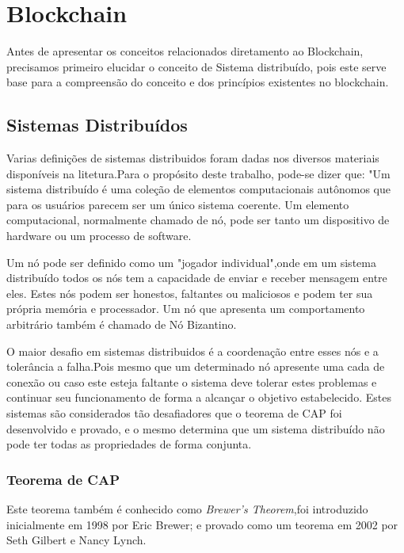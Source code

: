\section{Blockchain}

    Antes de apresentar os conceitos relacionados diretamento ao Blockchain, precisamos primeiro elucidar o conceito de Sistema distribuído, pois este serve
    base para a compreensão do conceito e dos princípios existentes no blockchain.

\subsection[]{Sistemas Distribuídos}

    Varias definições de sistemas distribuidos foram dadas nos diversos materiais disponíveis na litetura.Para o propósito deste trabalho, pode-se dizer que: "Um sistema distribuído é uma coleção de 
    elementos computacionais autônomos que para os usuários parecem ser um único sistema coerente. Um elemento computacional, normalmente chamado de nó, pode
    ser tanto um dispositivo de hardware ou um processo de software.\cite{sistemas_distribuidos_tanembaum}

    Um nó pode ser definido como um "jogador individual",onde em um sistema distribuído todos os nós tem a capacidade de enviar e receber mensagem entre eles. Estes
    nós podem ser honestos, faltantes ou maliciosos e podem ter sua própria memória e processador. Um nó que apresenta um comportamento arbitrário também é
    chamado de Nó Bizantino.\cite{mastering_blockchain}

    O maior desafio em sistemas distribuidos é a coordenação entre esses nós e a tolerância a falha.Pois mesmo que um determinado nó apresente uma cada de conexão
    ou caso este esteja faltante o sistema deve tolerar estes problemas e continuar seu funcionamento de forma a alcançar o objetivo estabelecido. Estes sistemas 
    são considerados tão desafiadores que o teorema de CAP foi desenvolvido e provado, e o mesmo determina que um sistema distribuído não pode ter todas as propriedades
    de forma conjunta.

    \subsubsection{Teorema de CAP}

        Este teorema também é conhecido como \textit{Brewer's Theorem},foi introduzido inicialmente em 1998 por Eric Brewer; e provado como um teorema em 2002 por
        Seth Gilbert e Nancy Lynch.


